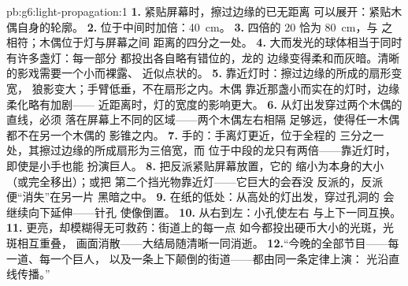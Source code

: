 \begin{solution}{pb:g6:light-propagation:1}
\textbf{1.} 紧贴屏幕时，擦过边缘的已无距离
可以展开：紧贴木偶自身的轮廓。
\textbf{2.} 位于中间时加倍：\qty{40}{cm}。
\textbf{3.} 四倍的 $20$ 恰为 \qty{80}{cm}，与
之相符；木偶位于灯与屏幕之间
距离的四分之一处。
\textbf{4.} 大而发光的球体相当于同时有许多盏灯：每一部分
都投出各自略有错位的，龙的
边缘变得柔和而灰暗。清晰的影戏需要一个小而裸露、
近似点状的。
\textbf{5.} 靠近灯时：擦过边缘的所成的扇形变宽，
狼影变大；手臂低垂，不在扇形之内。木偶
靠近那盏小而实在的灯时，边缘柔化略有加剧——
近距离时，灯的宽度的影响更大。
\textbf{6.} 从灯出发穿过两个木偶的直线，必须
落在屏幕上不同的区域——两个木偶左右相隔
足够远，使得任一木偶都不在另一个木偶的
影锥之内。
\textbf{7.} 手的：手离灯更近，位于全程的
三分之一处，其擦过边缘的所成扇形为三倍宽，而
位于中段的龙只有两倍——靠近灯时，即使是小手也能
扮演巨人。
\textbf{8.} 把反派紧贴屏幕放置，它的
缩小为本身的大小（或完全移出）；或把
第二个挡光物靠近灯——它巨大的会吞没
反派的，反派便“消失”在另一片
黑暗之中。
\textbf{9.} 在纸的低处：从高处的灯出发，穿过孔洞的
会继续向下延伸——针孔
使像倒置。
\textbf{10.} 从右到左：小孔使左右
与上下一同互换。
\textbf{11.} 更亮，却模糊得无可救药：街道上的每一点
如今都投出硬币大小的光斑，光斑相互重叠，
画面消散——大结局随清晰一同消逝。
\textbf{12.}“今晚的全部节目——每一道、每一个巨人，
以及一条上下颠倒的街道——都由同一条定律上演：
光沿直线传播。”
\end{solution}
